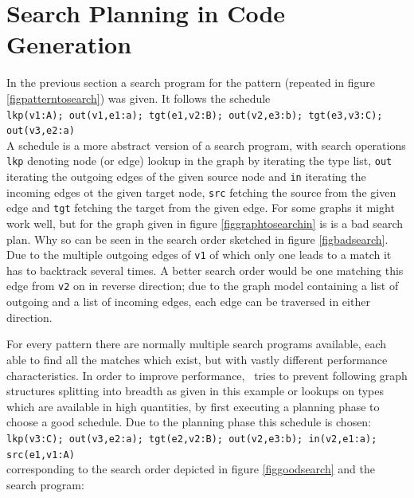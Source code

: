 \section{Search Planning in Code Generation}
\label{searchplanning}

In the previous section a search program for the pattern (repeated in figure \ref{figpatterntosearch}) was given.
It follows the schedule\\
\texttt{lkp(v1:A); out(v1,e1:a); tgt(e1,v2:B); out(v2,e3:b); tgt(e3,v3:C); out(v3,e2:a)}\\
A schedule is a more abstract version of a search program, with search operations \texttt{lkp} denoting node (or edge) lookup in the graph by iterating the type list, \texttt{out} iterating the outgoing edges of the given source node and \texttt{in} iterating the incoming edges ot the given target node, \texttt{src} fetching the source from the given edge and \texttt{tgt} fetching the target from the given edge.
For some graphs it might work well, but for the graph given in figure \ref{figgraphtosearchin} is is a bad search plan. Why so can be seen in the search order sketched in figure \ref{figbadsearch}.
Due to the multiple outgoing edges of \texttt{v1} of which only one leads to a match it has to backtrack several times. A better search order would be one matching this edge from \texttt{v2} on in reverse direction; due to the graph model containing a list of outgoing and a list of incoming edges, each edge can be traversed in either direction.

For every pattern there are normally multiple search programs available,
each able to find all the matches which exist, but with vastly different performance characteristics.
In order to improve performance, \GrG~tries to prevent following graph structures splitting into breadth as given in this example or lookups on types which are available in high quantities, by first executing a planning phase to choose a good schedule. Due to the planning phase this schedule is chosen:\\
\texttt{lkp(v3:C); out(v3,e2:a); tgt(e2,v2:B); out(v2,e3:b); in(v2,e1:a); src(e1,v1:A)}\\
corresponding to the search order depicted in figure \ref{figgoodsearch} and the search program:

